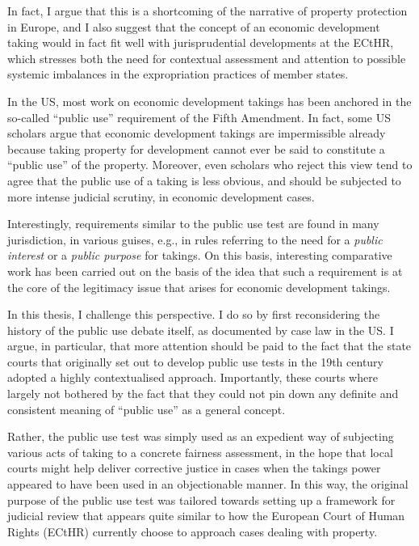 In fact, I argue that this is a shortcoming of the narrative of property protection in Europe, and I also suggest that the concept of an economic development taking would in fact fit well with jurisprudential developments at the ECtHR, which stresses both the need for contextual assessment and attention to possible systemic imbalances in the expropriation practices of member states.


In the US, most work on economic development takings has been anchored in the so-called ``public use'' requirement of the Fifth Amendment. In fact, some US scholars argue that economic development takings are impermissible already because taking property for development cannot ever be said to constitute a ``public use'' of the property. Moreover, even scholars who reject this view tend to agree that the public use of a taking is less obvious, and should be subjected to more intense judicial scrutiny, in economic development cases.

Interestingly, requirements similar to the public use test are found in many jurisdiction, in various guises, e.g., in rules referring to the need for a {\it public interest} or a {\it public purpose} for takings. On this basis, interesting comparative work has been carried out on the basis of the idea that such a requirement is at the core of the legitimacy issue that arises for economic development takings.

In this thesis, I challenge this perspective. I do so by first reconsidering the history of the public use debate itself, as documented by case law in the US. I argue, in particular, that more attention should be paid to the fact that the state courts that originally set out to develop public use tests in the 19th century adopted a highly contextualised approach. Importantly, these courts where largely not bothered by the fact that they could not pin down any definite and consistent meaning of ``public use'' as a general concept. 

Rather, the public use test was simply used as an expedient way of subjecting various acts of taking to a concrete fairness assessment, in the hope that local courts might help deliver corrective justice in cases when the takings power appeared to have been used in an objectionable manner. In this way, the original purpose of the public use test was tailored towards setting up a framework for judicial review that appears quite similar to how the European Court of Human Rights (ECtHR) currently choose to approach cases dealing with property.

